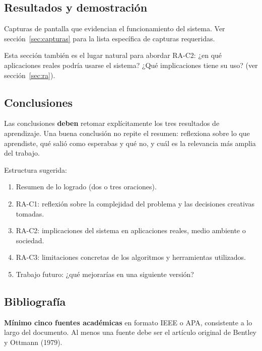 \documentclass[12pt, oneside]{article}
\begin{document}
\subsection{Resultados y demostración}

Capturas de pantalla que evidencian el funcionamiento del sistema.
Ver sección~\ref{sec:capturas} para la lista específica de capturas
requeridas.

Esta sección también es el lugar natural para abordar RA-C2: ¿en qué
aplicaciones reales podría usarse el sistema?  ¿Qué implicaciones
tiene su uso?  (ver sección~\ref{sec:ra}).

\subsection{Conclusiones}

Las conclusiones \textbf{deben} retomar explícitamente los tres
resultados de aprendizaje.  Una buena conclusión no repite el resumen:
reflexiona sobre lo que aprendiste, qué salió como esperabas y qué no,
y cuál es la relevancia más amplia del trabajo.

Estructura sugerida:
\begin{enumerate}
  \item Resumen de lo logrado (dos o tres oraciones).
  \item RA-C1: reflexión sobre la complejidad del problema y las
        decisiones creativas tomadas.
  \item RA-C2: implicaciones del sistema en aplicaciones reales,
        medio ambiente o sociedad.
  \item RA-C3: limitaciones concretas de los algoritmos y herramientas
        utilizados.
  \item Trabajo futuro: ¿qué mejorarías en una siguiente versión?
\end{enumerate}

\subsection{Bibliografía}

\textbf{Mínimo cinco fuentes académicas} en formato IEEE o APA,
consistente a lo largo del documento.  Al menos una fuente debe ser
el artículo original de Bentley y Ottmann (1979).
\end{document}
